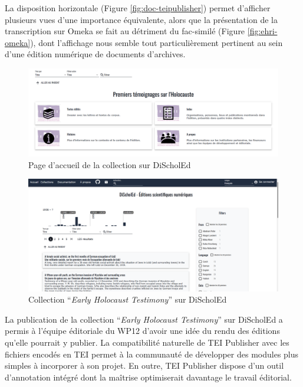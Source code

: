 La disposition horizontale (Figure \ref{fig:doc-teipublisher}) permet d'afficher plusieurs vues d'une importance équivalente, alors que la présentation de la transcription sur Omeka se fait au détriment du fac-similé (Figure \ref{fig:ehri-omeka}), dont l'affichage nous semble tout particulièrement pertinent au sein d'une édition numérique de documents d'archives.

\begin{figure}[h]
    \centering
    \includegraphics[width=1\linewidth]{2-MAIN/images/discholed-accueil.png}
    \caption{Page d'accueil de la collection sur DiScholEd}
    \label{fig:ehri-discholed-accueil}
\end{figure}

\begin{figure}[h]
    \centering
    \includegraphics[width=1\linewidth]{2-MAIN/images/discholed-collection.png}
    \caption{Collection \enquote{\textit{Early Holocaust Testimony}} sur DiScholEd}
    \label{fig:ehri-discholed-collection}
\end{figure}

\bigskip
\bigskip
La publication de la collection \enquote{\textit{Early Holocaust Testimony}} sur DiScholEd a permis à l'équipe éditoriale du WP12 d'avoir une idée du rendu des éditions qu'elle pourrait y publier. La compatibilité naturelle de TEI Publisher avec les fichiers encodés en TEI permet à la communauté de développer des modules plus simples à incorporer à son projet. En outre, TEI Publisher dispose d'un outil d'annotation intégré dont la maîtrise optimiserait davantage le travail éditorial.